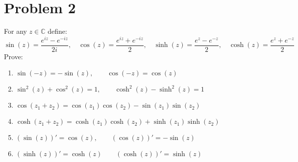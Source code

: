 \documentclass[12pt]{article}
\newcommand{\C}{\mathbb{C}}
\begin{document}
\newpage
\section{Problem 2}
For any $z\in\C$ define:
$$\sin(z)=\frac{e^{iz}-e^{-iz}}{2i},\quad\cos(z)=\frac{e^{iz}+e^{-iz}}{2},\quad\sinh(z)=\frac{e^{z}-e^{-z}}{2},\quad\cosh(z)=\frac{e^{z}+e^{-z}}{2}$$
Prove:
\begin{enumerate}[label=\textbf{(\alph*)}]
    \item $\sin(-z)=-\sin(z),\qquad\cos(-z)=\cos(z)$
    \item $\sin^{2}(z)+\cos^{2}(z)=1,\qquad\cosh^{2}(z)-\sinh^{2}(z)=1$
    \item $\cos(z_{1}+z_{2})=\cos(z_{1})\cos(z_{2})-\sin(z_{1})\sin(z_{2})$
    \item $\cosh(z_{1}+z_{2})=\cosh(z_{1})\cosh(z_{2})+\sinh(z_{1})\sinh(z_{2})$
    \item $(\sin(z))'=\cos(z),\qquad(\cos(z))'=-\sin(z)$
    \item $(\sinh(z))'=\cosh(z)\qquad(\cosh(z))'=\sinh(z)$
\end{enumerate}
\end{document}
